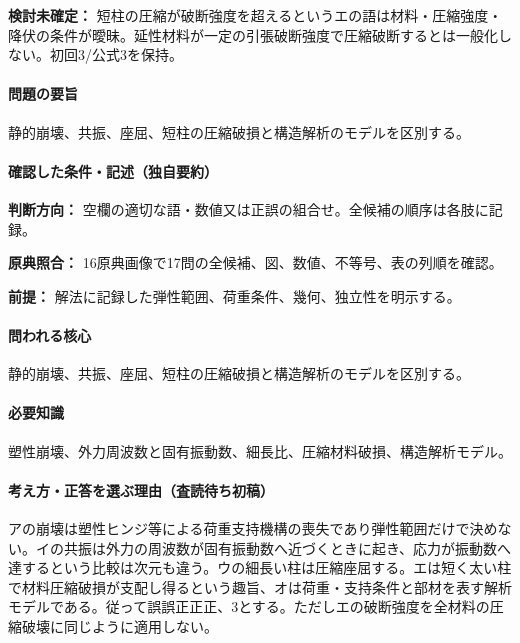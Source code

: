 \par\textbf{検討未確定：} 短柱の圧縮が破断強度を超えるというエの語は材料・圧縮強度・降伏の条件が曖昧。延性材料が一定の引張破断強度で圧縮破断するとは一般化しない。初回3/公式3を保持。

\paragraph{問題の要旨} 静的崩壊、共振、座屈、短柱の圧縮破損と構造解析のモデルを区別する。

\paragraph{確認した条件・記述（独自要約）}\mbox{}\par

\noindent\textbf{判断方向：} 空欄の適切な語・数値又は正誤の組合せ。全候補の順序は各肢に記録。\par

\noindent\textbf{原典照合：} 16原典画像で17問の全候補、図、数値、不等号、表の列順を確認。\par

\noindent\textbf{前提：} 解法に記録した弾性範囲、荷重条件、幾何、独立性を明示する。\par

\paragraph{問われる核心} 静的崩壊、共振、座屈、短柱の圧縮破損と構造解析のモデルを区別する。

\paragraph{必要知識} 塑性崩壊、外力周波数と固有振動数、細長比、圧縮材料破損、構造解析モデル。

\paragraph{考え方・正答を選ぶ理由（査読待ち初稿）} アの崩壊は塑性ヒンジ等による荷重支持機構の喪失であり弾性範囲だけで決めない。イの共振は外力の周波数が固有振動数へ近づくときに起き、応力が振動数へ達するという比較は次元も違う。ウの細長い柱は圧縮座屈する。エは短く太い柱で材料圧縮破損が支配し得るという趣旨、オは荷重・支持条件と部材を表す解析モデルである。従って誤誤正正正、3とする。ただしエの破断強度を全材料の圧縮破壊に同じように適用しない。

